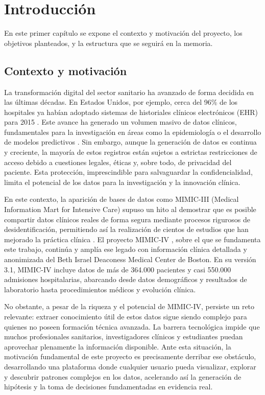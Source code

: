 \chapter{Introducción}

En este primer capítulo se expone el contexto y motivación del proyecto, los objetivos planteados, y la estructura que se seguirá en la memoria.

\section{Contexto y motivación}

La transformación digital del sector sanitario ha avanzado de forma decidida en las últimas décadas. En Estados Unidos, por ejemplo, cerca del 96\% de los hospitales ya habían adoptado sistemas de historiales clínicos electrónicos (EHR) para 2015 \cite{Henry2016_EHR}. Este avance ha generado un volumen masivo de datos clínicos, fundamentales para la investigación en áreas como la epidemiología o el desarrollo de modelos predictivos \cite{Halevy2009_data}. Sin embargo, aunque la generación de datos es continua y creciente, la mayoría de estos registros están sujetos a estrictas restricciones de acceso debido a cuestiones legales, éticas y, sobre todo, de privacidad del paciente. Esta protección, imprescindible para salvaguardar la confidencialidad, limita el potencial de los datos para la investigación y la innovación clínica.

En este contexto, la aparición de bases de datos como MIMIC-III \cite{MIMICIII_paper} (Medical Information Mart for Intensive Care) supuso un hito al demostrar que es posible compartir datos clínicos reales de forma segura mediante procesos rigurosos de desidentificación, permitiendo así la realización de cientos de estudios que han mejorado la práctica clínica \cite{Kallout2025_contribution}. El proyecto MIMIC-IV \cite{MIMICIV_paper, MIMICIV_dataset}, sobre el que se fundamenta este trabajo, continúa y amplía ese legado con información clínica detallada y anonimizada del Beth Israel Deaconess Medical Center de Boston. En su versión 3.1, MIMIC-IV incluye datos de más de 364.000 pacientes y casi 550.000 admisiones hospitalarias, abarcando desde datos demográficos y resultados de laboratorio hasta procedimientos médicos y evolución clínica.

\newpage
No obstante, a pesar de la riqueza y el potencial de MIMIC-IV, persiste un reto relevante: extraer conocimiento útil de estos datos sigue siendo complejo para quienes no poseen formación técnica avanzada. La barrera tecnológica impide que muchos profesionales sanitarios, investigadores clínicos y estudiantes puedan aprovechar plenamente la información disponible. Ante esta situación, la motivación fundamental de este proyecto es precisamente derribar ese obstáculo, desarrollando una plataforma donde cualquier usuario pueda visualizar, explorar y descubrir patrones complejos en los datos, acelerando así la generación de hipótesis y la toma de decisiones fundamentadas en evidencia real.

